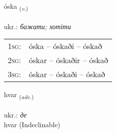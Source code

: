 \documentclass[frontgrid, backgrid]{flacards}\usepackage[]{graphicx}\usepackage[]{xcolor}
\begin{document}
\renewcommand{\flhead}{\vskip5pt \fboxsep=0pt {\small\bfseries\footnotesize Sagnorð | дієслово}}
\renewcommand{\fcfoot}{\vskip5pt \fboxsep=0pt \hspace{2pt}{\small\bfseries\footnotesize 1K}}

\renewcommand{\blhead}{\vskip5pt {\small\bfseries\footnotesize Sagnorð | дієслово }}
\renewcommand{\bcfoot}{\vskip5pt \hspace{2pt}{\small\bfseries\footnotesize 1K}}


{óska \small{\textsubscript{(\textit{v.})}} \\[1ex] %
\textphonetic{[ouska]} \\
ukr.: \emph{бажати; хотіти} \\  [2ex]
\renewcommand*{\arraystretch}{0.8}
\begin{tabular}{p{1cm}l}
\textsc{1sg}: & óska -- óskaði -- óskað \\ 
\textsc{2sg}: & óskar -- óskaðir -- óskað \\ 
\textsc{3sg}: & óskar -- óskaði -- óskað \\ 
\end{tabular}
}


\renewcommand{\flhead}{\vskip5pt \fboxsep=0pt {\small\bfseries\footnotesize Atviksorð | прислівник}}
\renewcommand{\fcfoot}{\vskip5pt \fboxsep=0pt \hspace{2pt}{\small\bfseries\footnotesize 1K}}

\renewcommand{\blhead}{\vskip5pt {\small\bfseries\footnotesize Atviksorð | прислівник }}
\renewcommand{\bcfoot}{\vskip5pt \hspace{2pt}{\small\bfseries\footnotesize 1K}}


{hvar \small{\textsubscript{(\textit{adv.})}} \\[1ex]
\textphonetic{[kʰvaːr]} \\
ukr.: \emph{де} \\  [2ex]
hvar (Indeclinable)}
\end{document}
